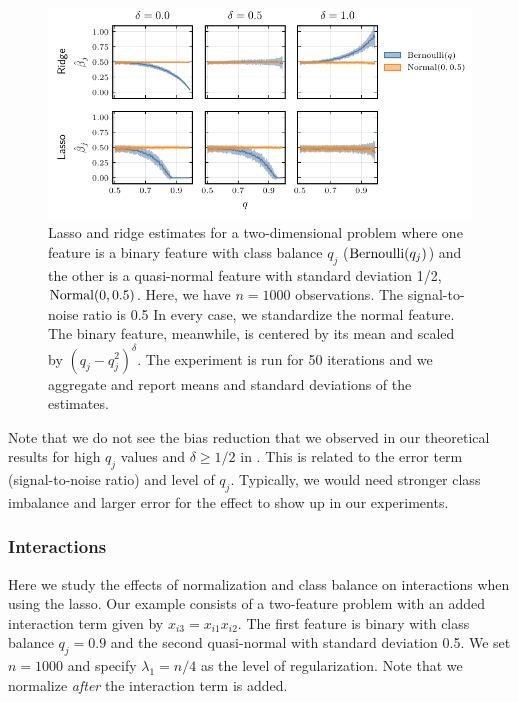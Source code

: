 \begin{figure}[htpb]
  \centering
  \includegraphics{plots/mixed_data.pdf}
  \caption{%
    Lasso and ridge estimates for a two-dimensional problem where one feature is a binary
    feature with class balance \(q_j\) (\(\operatorname{Bernoulli}(q_j)\)) and the other is a quasi-normal
    feature with standard deviation 1/2, \(\operatorname{Normal}(0, 0.5)\). Here, we have \(n = \num{1000}\)
    observations. The signal-to-noise ratio is 0.5 In every case, we standardize the normal
    feature. The binary feature, meanwhile, is centered by its mean and scaled by
    \((q_j-q_j^2)^\delta\). The experiment is run for 50 iterations and we aggregate and report
    means and standard deviations of the estimates.\label{fig:lasso-ridge-comparison}
  }
\end{figure}

Note that we do not see the bias reduction that we observed in our theoretical results for
high \(q_j\) values and \(\delta \geq 1/2\) in . This is
related to the error term (signal-to-noise ratio) and level of \(q_j\). Typically, we would
need stronger class imbalance and larger error for the effect to show up in our
experiments.

\subsubsection{Interactions}\label{sec:experiments-interactions}

Here we study the effects of normalization and class balance on interactions when using the
lasso. Our example consists of a two-feature problem with an added interaction term given
by \(x_{i3} = x_{i1}x_{i2}\). The first feature is binary with class balance \(q_j=0.9\)
and the second quasi-normal with standard deviation 0.5. We set \(n=1000\) and specify
\(\lambda_1 = n/4\) as the level of regularization. Note that we normalize \emph{after} the
interaction term is added.

